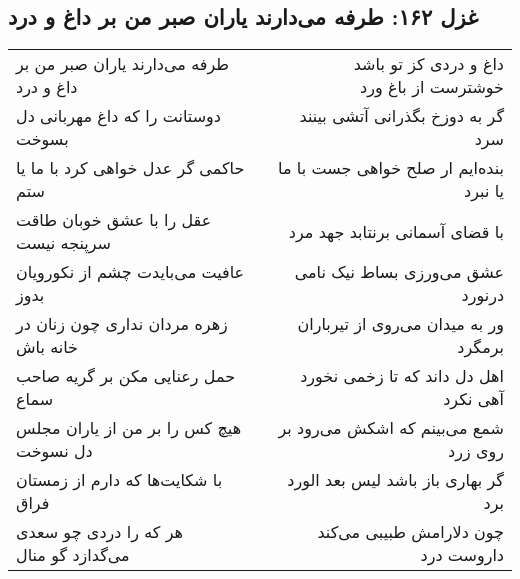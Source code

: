 \begin{center}
\section*{غزل ۱۶۲: طرفه می‌دارند یاران صبر من بر داغ و درد}
\label{sec:162}
\begin{longtable}{l p{0.5cm} r}
طرفه می‌دارند یاران صبر من بر داغ و درد
&&
داغ و دردی کز تو باشد خوشترست از باغ ورد
\\
دوستانت را که داغ مهربانی دل بسوخت
&&
گر به دوزخ بگذرانی آتشی بینند سرد
\\
حاکمی گر عدل خواهی کرد با ما یا ستم
&&
بنده‌ایم ار صلح خواهی جست با ما یا نبرد
\\
عقل را با عشق خوبان طاقت سرپنجه نیست
&&
با قضای آسمانی برنتابد جهد مرد
\\
عافیت می‌بایدت چشم از نکورویان بدوز
&&
عشق می‌ورزی بساط نیک نامی درنورد
\\
زهره مردان نداری چون زنان در خانه باش
&&
ور به میدان می‌روی از تیرباران برمگرد
\\
حمل رعنایی مکن بر گریه صاحب سماع
&&
اهل دل داند که تا زخمی نخورد آهی نکرد
\\
هیچ کس را بر من از یاران مجلس دل نسوخت
&&
شمع می‌بینم که اشکش می‌رود بر روی زرد
\\
با شکایت‌ها که دارم از زمستان فراق
&&
گر بهاری باز باشد لیس بعد الورد برد
\\
هر که را دردی چو سعدی می‌گدازد گو منال
&&
چون دلارامش طبیبی می‌کند داروست درد
\\
\end{longtable}
\end{center}

